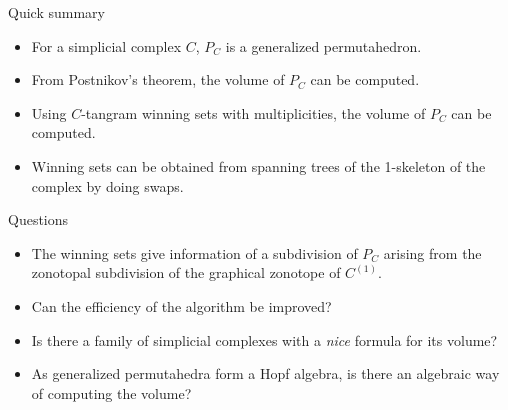 \documentclass{beamer}
\begin{document}
\begin{frame}{Quick summary}
\pause
\begin{itemize}
    \item For a simplicial complex $C$, $P_C$ is a generalized permutahedron. 
    \item From Postnikov's theorem, the volume of $P_C$ can be computed.
    \item Using $C$-tangram winning sets with multiplicities, the volume of $P_C$ can be computed.
    \item Winning sets can be obtained from spanning trees of the 1-skeleton of the complex by doing swaps.
    
\end{itemize}
    
\end{frame}

\begin{frame}{Questions}
\begin{itemize}
    \item The winning sets give information of a subdivision of $P_C$ arising from the zonotopal subdivision of the graphical zonotope of $C^{(1)}$.
    \item Can the efficiency of the algorithm be improved?
    \item Is there a family of simplicial complexes with a \textit{nice} formula for its volume?
    \item As generalized permutahedra form a Hopf algebra, is there an algebraic way of computing the volume?
\end{itemize}    
\end{frame}
\end{document}
